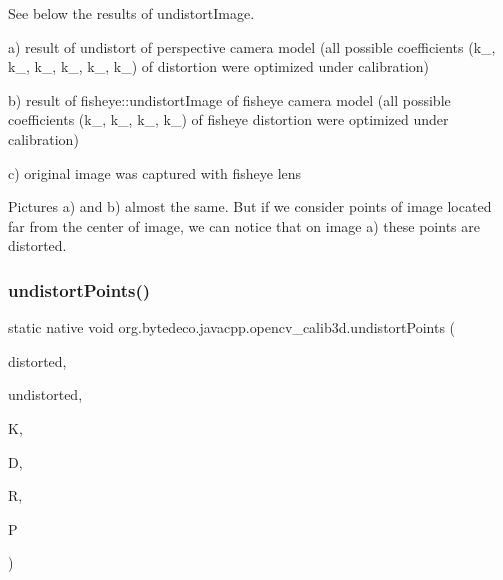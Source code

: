 See below the results of undistort\+Image.
\begin{DoxyItemize}
\item a) result of undistort of perspective camera model (all possible coefficients (k\+\_, k\+\_, k\+\_, k\+\_, k\+\_, k\+\_) of distortion were optimized under calibration)
\begin{DoxyItemize}
\item b) result of fisheye\+::undistort\+Image of fisheye camera model (all possible coefficients (k\+\_, k\+\_, k\+\_, k\+\_) of fisheye distortion were optimized under calibration)
\item c) original image was captured with fisheye lens 
\end{DoxyItemize}

Pictures a) and b) almost the same. But if we consider points of image located far from the center of image, we can notice that on image a) these points are distorted. 

 
\end{DoxyItemize}\mbox{\label{group__calib3d__fisheye_ga76244e0842b37e17c2b00ef9a015b99a}} 
\subsubsection{\texorpdfstring{undistort\+Points()}{undistortPoints()}}
{\footnotesize\ttfamily static native void org.\+bytedeco.\+javacpp.\+opencv\+\_\+calib3d.\+undistort\+Points (\begin{DoxyParamCaption}\item[{@By\+Val Mat}]{distorted,  }\item[{@By\+Val Mat}]{undistorted,  }\item[{@By\+Val Mat}]{K,  }\item[{@By\+Val Mat}]{D,  }\item[{@By\+Val(null\+Value=\char`\"{}cv\+::\+Input\+Array(cv\+::no\+Array())\char`\"{}) Mat}]{R,  }\item[{@By\+Val(null\+Value=\char`\"{}cv\+::\+Input\+Array(cv\+::no\+Array())\char`\"{}) Mat}]{P }\end{DoxyParamCaption})\hspace{0.3cm}{\ttfamily [static]}}



